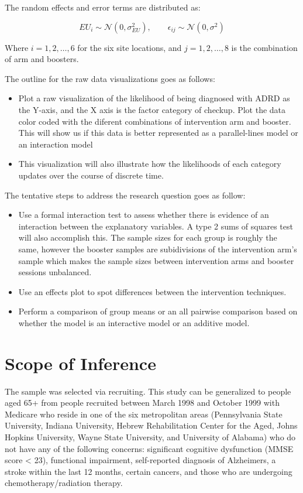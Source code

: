 \documentclass[11pt]{article}
\begin{document}
The random effects and error terms are distributed as:

\begin{equation}
EU_{i} \sim \mathcal{N}(0, \sigma^2_{EU}), \qquad \epsilon_{ij} \sim \mathcal{N}(0, \sigma^2)
\end{equation}

Where \(i = 1, 2, \ldots, 6\) for the six site locations, and \(j = 1, 2, \ldots, 8\) is the combination of arm and boosters.


The outline for the raw data visualizations goes as follows:
\begin{itemize}
\item Plot a raw visualization of the likelihood of being diagnosed with ADRD as the Y-axis, and the X axis is the factor category of checkup. Plot the data color coded with the diferent combinations of intervention arm and booster. This will show us if this data is better represented as a parallel-lines model or an interaction model
\item This visualization will also illustrate how the likelihoods of each category updates over the course of discrete time.
\end{itemize}

The tentative steps to address the research question goes as follow: 
\begin{itemize}
\item Use a formal interaction test to assess whether there is evidence of an interaction between the explanatory variables. A type 2 sums of squares test will also accomplish this. The sample sizes for each group is roughly the same, however the booster samples are subidivisions of the intervention arm's sample which makes the sample sizes between intervention arms and booster sessions unbalanced.
\item Use an effects plot to spot differences between the intervention techniques.
\item Perform a comparison of group means or an all pairwise comparison based on whether the model is an interactive model or an additive model.
\end{itemize}


\section{Scope of Inference}
\label{sec:org8996e30}

The sample was selected via recruiting. This study can be generalized to people aged 65+ from people recruited between March 1998 and October 1999 with Medicare who reside in one of the six metropolitan areas (Pennsylvania State University, Indiana University, Hebrew Rehabilitation Center for the Aged, Johns Hopkins University, Wayne State University, and University of Alabama) who do not have any of the following concerns: significant cognitive dysfunction (MMSE score < 23), functional impairment, self-reported diagnosis of Alzheimers, a stroke within the last 12 months, certain cancers, and those who are undergoing chemotherapy/radiation therapy.
\end{document}
